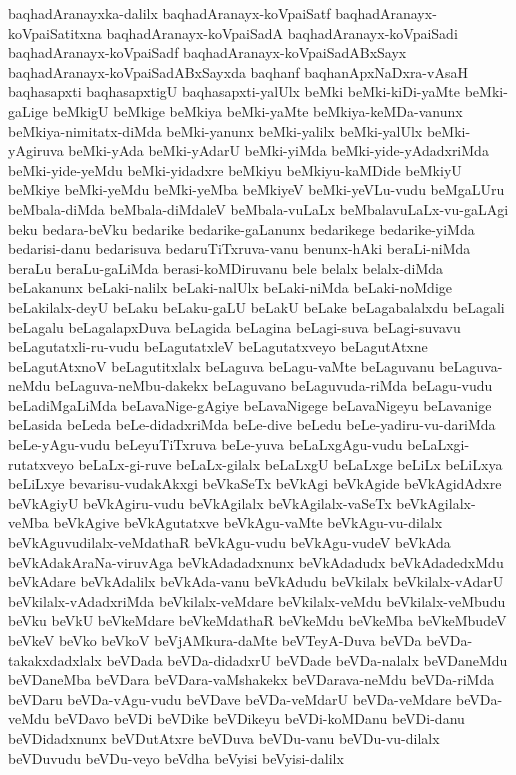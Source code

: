 {baqhadAranayxka-dalilx
baqhadAranayx-koVpaiSatf
baqhadAranayx-koVpaiSatitxna
baqhadAranayx-koVpaiSadA
baqhadAranayx-koVpaiSadi
baqhadAranayx-koVpaiSadf
baqhadAranayx-koVpaiSadABxSayx
baqhadAranayx-koVpaiSadABxSayxda
baqhanf
baqhanApxNaDxra-vAsaH
baqhasapxti
baqhasapxtigU
baqhasapxti-yalUlx
beMki
beMki-kiDi-yaMte
beMki-gaLige
beMkigU
beMkige
beMkiya
beMki-yaMte
beMkiya-keMDa-vanunx
beMkiya-nimitatx-diMda
beMki-yanunx
beMki-yalilx
beMki-yalUlx
beMki-yAgiruva
beMki-yAda
beMki-yAdarU
beMki-yiMda
beMki-yide-yAdadxriMda
beMki-yide-yeMdu
beMki-yidadxre
beMkiyu
beMkiyu-kaMDide
beMkiyU
beMkiye
beMki-yeMdu
beMki-yeMba
beMkiyeV
beMki-yeVLu-vudu
beMgaLUru
beMbala-diMda
beMbala-diMdaleV
beMbala-vuLaLx
beMbalavuLaLx-vu-gaLAgi
beku
bedara-beVku
bedarike
bedarike-gaLanunx
bedarikege
bedarike-yiMda
bedarisi-danu
bedarisuva
bedaruTiTxruva-vanu
benunx-hAki
beraLi-niMda
beraLu
beraLu-gaLiMda
berasi-koMDiruvanu
bele
belalx
belalx-diMda
beLakanunx
beLaki-nalilx
beLaki-nalUlx
beLaki-niMda
beLaki-noMdige
beLakilalx-deyU
beLaku
beLaku-gaLU
beLakU
beLake
beLagabalalxdu
beLagali
beLagalu
beLagalapxDuva
beLagida
beLagina
beLagi-suva
beLagi-suvavu
beLagutatxli-ru-vudu
beLagutatxleV
beLagutatxveyo
beLagutAtxne
beLagutAtxnoV
beLagutitxlalx
beLaguva
beLagu-vaMte
beLaguvanu
beLaguva-neMdu
beLaguva-neMbu-dakekx
beLaguvano
beLaguvuda-riMda
beLagu-vudu
beLadiMgaLiMda
beLavaNige-gAgiye
beLavaNigege
beLavaNigeyu
beLavanige
beLasida
beLeda
beLe-didadxriMda
beLe-dive
beLedu
beLe-yadiru-vu-dariMda
beLe-yAgu-vudu
beLeyuTiTxruva
beLe-yuva
beLaLxgAgu-vudu
beLaLxgi-rutatxveyo
beLaLx-gi-ruve
beLaLx-gilalx
beLaLxgU
beLaLxge
beLiLx
beLiLxya
beLiLxye
bevarisu-vudakAkxgi
beVkaSeTx
beVkAgi
beVkAgide
beVkAgidAdxre
beVkAgiyU
beVkAgiru-vudu
beVkAgilalx
beVkAgilalx-vaSeTx
beVkAgilalx-veMba
beVkAgive
beVkAgutatxve
beVkAgu-vaMte
beVkAgu-vu-dilalx
beVkAguvudilalx-veMdathaR
beVkAgu-vudu
beVkAgu-vudeV
beVkAda
beVkAdakAraNa-viruvAga
beVkAdadadxnunx
beVkAdadudx
beVkAdadedxMdu
beVkAdare
beVkAdalilx
beVkAda-vanu
beVkAdudu
beVkilalx
beVkilalx-vAdarU
beVkilalx-vAdadxriMda
beVkilalx-veMdare
beVkilalx-veMdu
beVkilalx-veMbudu
beVku
beVkU
beVkeMdare
beVkeMdathaR
beVkeMdu
beVkeMba
beVkeMbudeV
beVkeV
beVko
beVkoV
beVjAMkura-daMte
beVTeyA-Duva
beVDa
beVDa-takakxdadxlalx
beVDada
beVDa-didadxrU
beVDade
beVDa-nalalx
beVDaneMdu
beVDaneMba
beVDara
beVDara-vaMshakekx
beVDarava-neMdu
beVDa-riMda
beVDaru
beVDa-vAgu-vudu
beVDave
beVDa-veMdarU
beVDa-veMdare
beVDa-veMdu
beVDavo
beVDi
beVDike
beVDikeyu
beVDi-koMDanu
beVDi-danu
beVDidadxnunx
beVDutAtxre
beVDuva
beVDu-vanu
beVDu-vu-dilalx
beVDuvudu
beVDu-veyo
beVdha
beVyisi
beVyisi-dalilx
}
